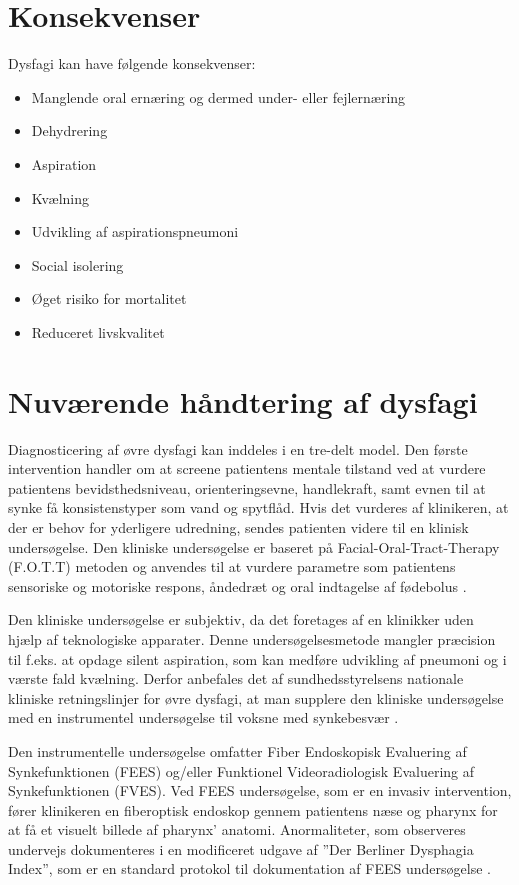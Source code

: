 \documentclass[main.tex]{subfiles}
\begin{document}
\section*{Konsekvenser}
Dysfagi kan have følgende konsekvenser\cite[s. 12]{KjaersgaardPh.d.studerendeDYSFAGIKonsekvenser}:
\begin{itemize}
\item Manglende oral ernæring og dermed under- eller fejlernæring
\item Dehydrering
\item Aspiration
\item Kvælning
\item Udvikling af aspirationspneumoni
\item Social isolering
\item Øget risiko for mortalitet
\item Reduceret livskvalitet

\end{itemize}



\section*{Nuværende håndtering af dysfagi}


Diagnosticering af øvre dysfagi kan inddeles i en tre-delt model. Den første intervention handler om at screene patientens mentale tilstand ved at vurdere patientens bevidsthedsniveau, orienteringsevne, handlekraft, samt evnen til at synke få konsistenstyper som vand og spytflåd. Hvis det vurderes af klinikeren, at der er behov for yderligere udredning, sendes patienten videre til en klinisk undersøgelse. Den kliniske undersøgelse er baseret på Facial-Oral-Tract-Therapy (F.O.T.T) metoden og anvendes til at vurdere parametre som patientens sensoriske og motoriske respons, åndedræt og oral indtagelse af fødebolus \cite[s. 23-25]{Kjaersgaard2013DifficultiesPerspective}. 

Den kliniske undersøgelse er subjektiv, da det foretages af en klinikker uden hjælp af teknologiske apparater. Denne undersøgelsesmetode mangler præcision til f.eks. at opdage silent aspiration, som kan medføre udvikling af pneumoni og i værste fald kvælning. Derfor anbefales det af sundhedsstyrelsens nationale kliniske retningslinjer for øvre dysfagi, at man supplere den kliniske undersøgelse med en instrumentel undersøgelse til voksne med synkebesvær \cite{Sundhedsstyrelsen2015NationalDysfagi}.

Den instrumentelle undersøgelse omfatter Fiber Endoskopisk Evaluering af Synkefunktionen (FEES) og/eller Funktionel Videoradiologisk Evaluering af Synkefunktionen (FVES).  Ved FEES undersøgelse, som er en invasiv intervention, fører klinikeren en fiberoptisk endoskop gennem patientens næse og pharynx for at få et visuelt billede af pharynx' anatomi. Anormaliteter, som observeres undervejs dokumenteres i en modificeret udgave af ”Der Berliner Dysphagia Index”, som er en standard protokol til dokumentation af FEES undersøgelse \cite{afLambertsenKMDKock-JensenCMDKjrsgaardAMScOTHansenTSMsci/MPHWestergaardLMD2007ModificeretIndex}. 
\end{document}
